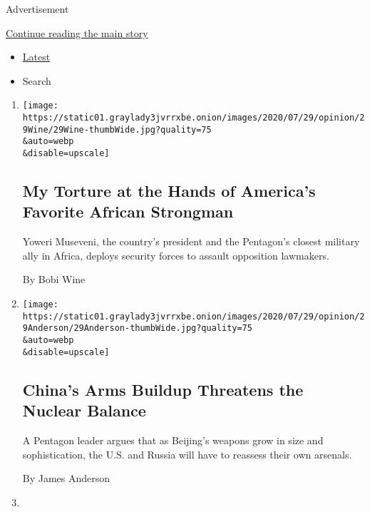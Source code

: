 Advertisement

\protect\hyperlink{after-mid1}{Continue reading the main story}

\begin{itemize}
\tightlist
\item
  \protect\hyperlink{stream-panel}{Latest}
\item
  Search
\end{itemize}

\begin{enumerate}
\def\labelenumi{\arabic{enumi}.}
\item
  \href{/2020/07/29/opinion/uganda-museveni-repression.html}{}

  \texttt{[image: https://static01.graylady3jvrrxbe.onion/images/2020/07/29/opinion/29Wine/29Wine-thumbWide.jpg?quality=75\\\&auto=webp\\\&disable=upscale]}

  \hypertarget{my-torture-at-the-hands-of-americas-favorite-african-strongman}{%
  \subsection{My Torture at the Hands of America's Favorite African
  Strongman}\label{my-torture-at-the-hands-of-americas-favorite-african-strongman}}

  Yoweri Museveni, the country's president and the Pentagon's closest
  military ally in Africa, deploys security forces to assault opposition
  lawmakers.

  By Bobi Wine
\item
  \href{/2020/07/29/opinion/russia-china-nuclear-weapons.html}{}

  \texttt{[image: https://static01.graylady3jvrrxbe.onion/images/2020/07/29/opinion/29Anderson/29Anderson-thumbWide.jpg?quality=75\\\&auto=webp\\\&disable=upscale]}

  \hypertarget{chinas-arms-buildup-threatens-the-nuclear-balance}{%
  \subsection{China's Arms Buildup Threatens the Nuclear
  Balance}\label{chinas-arms-buildup-threatens-the-nuclear-balance}}

  A Pentagon leader argues that as Beijing's weapons grow in size and
  sophistication, the U.S. and Russia will have to reassess their own
  arsenals.

  By James Anderson
\item
  \href{/2020/07/29/opinion/jainism-nonviolence-death.html}{}


\end{enumerate}
